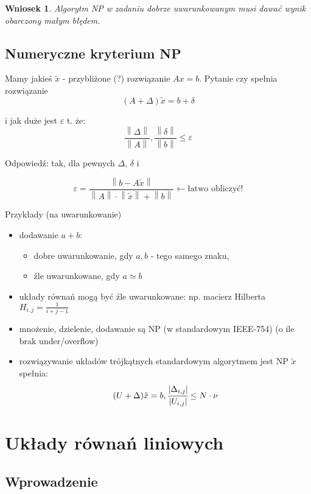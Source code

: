 \documentclass[hidelinks,a4paper,fleqn,oneside]{book}
\newcommand{\la}{\leftarrow}
\newcommand{\norm}[1]{\left\lVert#1\right\rVert}
\newtheorem{wniosek}{Wniosek}
\begin{document}
\begin{wniosek} Algorytm NP w zadaniu dobrze uwarunkowanym musi dawać wynik obarczony małym błędem. \end{wniosek}

\section{Numeryczne kryterium NP}

Mamy jakieś $\tilde{x}$ - przybliżone (?) rozwiązanie $Ax = b$. Pytanie czy spełnia rozwiązanie
\[
	(A + \Delta)\tilde{x} = b + \delta
\]

i jak duże jest $\varepsilon$ t. że:
\[
	\frac{\norm{\Delta}}{\norm{A}}, \frac{\norm{\delta}}{\norm{b}} \leq \varepsilon
\]

Odpowiedź: tak, dla pewnych $\Delta$, $\delta$ i 

\[
	\varepsilon = \frac{\norm{b - A\tilde{x}}}{\norm{A} \cdot \norm{\tilde{x}} + \norm{b}} \la \textrm{łatwo obliczyć!}
\]

Przykłady (na uwarunkowanie)

\begin{itemize}
	\item dodawanie $a+b$:
	      \begin{itemize}
	      	\item dobre uwarunkowanie, gdy $a, b$ -  tego samego znaku,
	      	\item źle uwarunkowane, gdy $a \simeq b$
	      \end{itemize}
	\item układy równań mogą być źle uwarunkowane: np. macierz Hilberta $H_{i,j} = \frac{1}{i+j-1}$
	\item mnożenie, dzielenie, dodawanie są NP (w standardowym IEEE-754) (o ile brak under/overflow)
	\item rozwiązywanie układów trójkątnych standardowym algorytmem jest NP $\tilde{x}$ spełnia:
	      \[
	      	(U+\Delta)\tilde{x} = b, \cfrac{|\Delta_{i, j}|}{|U_{i, j}|} \leq N \cdot \nu
	      \]
\end{itemize}

\chapter{Układy równań liniowych}

\section{Wprowadzenie}
\end{document}
